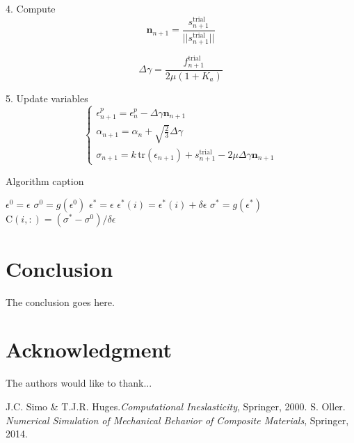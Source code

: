 \documentclass[conference]{IEEEtran}
\begin{document}
4. Compute
\begin {equation}
\mathbf{n}_{n+1} = \frac{s_{n+1}^{\text{trial}}}{|| s_{n+1}^{\text{trial}} ||}
\end {equation}

\begin {equation}
\Delta \gamma = \frac{f_{n+1}^{\text{trial}}}{2\mu(1+K_{a})}
\end {equation}

5. Update variables
\begin {equation}
\left\{
\begin{array}{ll}
\epsilon_{n+1}^{p} = \epsilon_{n}^{p} - \Delta \gamma  \mathbf{n}_{n+1} \\[5pt]
\alpha_{n+1} = \alpha_{n} + \sqrt{\frac{2}{3}} \Delta \gamma \\[5pt]
\sigma_{n+1} = k \, \text{tr} (\epsilon_{n+1}) + s_{n+1}^{\text{trial}} - 2 \mu \Delta \gamma \mathbf{n}_{n+1} 
\end{array}
\right.
\end {equation}

\begin{algorithm}
\caption{Algorithm caption}
\label{alg:algorithm-label}
\begin{algorithmic}
 \STATE $ \epsilon^{0} = \epsilon $
 \STATE $ \sigma^{0} = g(\epsilon^{0})$
     \STATE $ \epsilon^{*} = \epsilon $
     \STATE $ \epsilon^{*}(i) = \epsilon^{*}(i) + \delta\epsilon $
     \STATE $ \sigma^{*} = g(\epsilon^{*})$
     \STATE $ \mathrm{C} (i, :) = ( \sigma^* - \sigma^0 ) / \delta\epsilon $
 \ENDFOR
\end{algorithmic}
\end{algorithm}


\section{Conclusion}
The conclusion goes here.

\section*{Acknowledgment}

The authors would like to thank...

\begin{thebibliography}{1}
 J.C. Simo \& T.J.R. Huges.\emph{Computational Ineslasticity}, Springer, 2000. 
 S. Oller. \emph{Numerical Simulation of Mechanical Behavior of Composite Materials}, Springer, 2014. 
\end{thebibliography}
\end{document}
